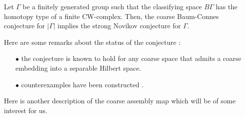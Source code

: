 \begin{thm}
Let $\Gamma$ be a finitely generated group such that the classifying space $B\Gamma$ has the homotopy type of a finite CW-complex. Then, the coarse Baum-Connes conjecture for $|\Gamma |$ implies the strong Novikov conjecture for $\Gamma$. 
\end{thm}

Here are some remarks about the status of the conjecture :
\begin{itemize}
\item[$\bullet$] the conjecture is known to hold for any coarse space that admits a coarse embedding into a  separable Hilbert space\cite{Yu2}.
\item[$\bullet$] counterexamples have been constructed \cite{HigsonLaffSk}.\\
\end{itemize}

Here is another description of the coarse assembly map which will be of some interest for us.\\

